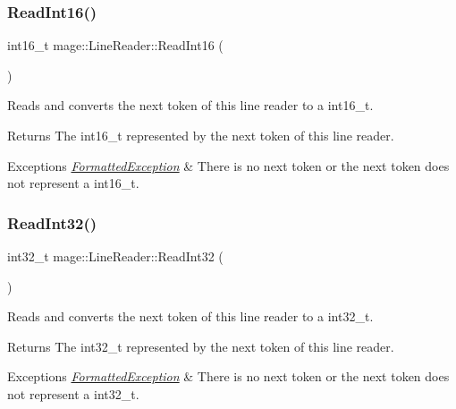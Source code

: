 \subsubsection{\texorpdfstring{Read\+Int16()}{ReadInt16()}}
{\footnotesize\ttfamily int16\+\_\+t mage\+::\+Line\+Reader\+::\+Read\+Int16 (\begin{DoxyParamCaption}{ }\end{DoxyParamCaption})\hspace{0.3cm}{\ttfamily [protected]}}

Reads and converts the next token of this line reader to a {\ttfamily int16\+\_\+t}.

\begin{DoxyReturn}{Returns}
The {\ttfamily int16\+\_\+t} represented by the next token of this line reader. 
\end{DoxyReturn}

\begin{DoxyExceptions}{Exceptions}
{\em \hyperlink{structmage_1_1_formatted_exception}{Formatted\+Exception}} & There is no next token or the next token does not represent a {\ttfamily int16\+\_\+t}. \\
\hline
\end{DoxyExceptions}
\hypertarget{classmage_1_1_line_reader_a45c66ad0b4676ef3fb2b5b08f04b509d}{}\label{classmage_1_1_line_reader_a45c66ad0b4676ef3fb2b5b08f04b509d} 
\subsubsection{\texorpdfstring{Read\+Int32()}{ReadInt32()}}
{\footnotesize\ttfamily int32\+\_\+t mage\+::\+Line\+Reader\+::\+Read\+Int32 (\begin{DoxyParamCaption}{ }\end{DoxyParamCaption})\hspace{0.3cm}{\ttfamily [protected]}}

Reads and converts the next token of this line reader to a {\ttfamily int32\+\_\+t}.

\begin{DoxyReturn}{Returns}
The {\ttfamily int32\+\_\+t} represented by the next token of this line reader. 
\end{DoxyReturn}

\begin{DoxyExceptions}{Exceptions}
{\em \hyperlink{structmage_1_1_formatted_exception}{Formatted\+Exception}} & There is no next token or the next token does not represent a {\ttfamily int32\+\_\+t}. \\
\hline
\end{DoxyExceptions}
\hypertarget{classmage_1_1_line_reader_af78e657c17cfff3bfc5fed42fbc47085}{}\label{classmage_1_1_line_reader_af78e657c17cfff3bfc5fed42fbc47085} 
